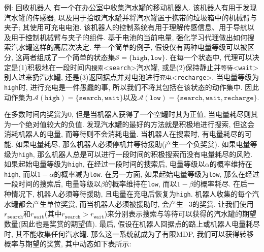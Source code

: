 \hypertarget{exam:3.3}{}
%
\begin{mathbox}{例\theexamcnt: 回收机器人}
有一个在办公室中收集汽水罐的移动机器人. 该机器人有用于发现汽水罐的传感器, 以及用于拾取汽水罐并将汽水罐置于携带的垃圾箱中的机械臂与夹子; 其使用可充电电池. 该机器人的控制系统有用于理解传感信息、用于导航以及用于控制机械臂与夹子的组件. 基于电池的当前电量, 强化学习代理做出如何搜索汽水罐这样的高层次决定. 举一个简单的例子, 假设仅有两种电量等级可以被区分, 这两者组成了一个简单的状态集$\mathcal{S} = \{ \mathtt{high, low} \}$. 在每一个状态中, 代理可以决定是(1)积极地在一段时间内\texttt{搜索}<\texttt{search}>汽水罐, 或是(2)保持静止并\texttt{等待}<\texttt{wait}>别人过来扔汽水罐, 还是(3)返回据点并对电池进行\texttt{充电}<\texttt{recharge}>. 当电量等级为\texttt{high}时, 进行充电是一件愚蠢的事, 所以我们不将其包括在该状态的动作集中. 因此动作集为$\mathcal{A}(\mathtt{high}) = \{ \mathtt{search, wait} \}$以及$\mathcal{A}(\mathtt{low}) = \{ \mathtt{search, wait, recharge} \}$.

在多数时间内奖赏为0, 但是当机器人获得了一个空罐时其为正值, 当电量耗尽则其为一个绝对值较大的负值. 发现汽水罐的最好的方法就是积极地进行搜索, 但这会消耗机器人的电量, 而等待则不会消耗电量. 当机器人在搜索时, 有电量耗尽的可能. 如果电量耗尽, 那么机器人必须停机并等待援助(产生一个负奖赏). 如果电量等级为\texttt{high}, 那么机器人总是可以进行一段时间的积极搜索而没有电量耗尽的风险. 如果起始电量等级为\texttt{high}, 在经过一段时间的搜索后, 电量等级以$\alpha$的概率维持在\texttt{high}, 而以$1 - \alpha$的概率减为\texttt{low}. 在另一方面, 如果起始电量等级为\texttt{low}, 那么在经过一段时间的搜索后, 电量等级以$\beta$的概率维持在\texttt{low}, 而以$1 - \beta$的概率耗尽. 在后一种情况下, 机器人必须等待援助, 且电量在充电后恢复为\texttt{high}. 机器人收集的每个汽水罐都会产生单位奖赏, 而当机器人必须被援助时, 会产生$-3$的奖赏. 让我们使用$r_{\mathtt{search}}$和$r_{\mathtt{wait}}$(其中$r_{\mathtt{search}} > r_{\mathtt{wait}}$)来分别表示搜索与等待可以获得的汽水罐的期望数量(因此也是奖赏的期望值). 最后, 假设在机器人回据点的路上或机器人电量耗尽时, 其不能收集任何汽水罐. 那么这一系统就成为了有限MDP, 我们可以获得转移概率与期望的奖赏, 其中动态如下表所示:


\end{mathbox}
